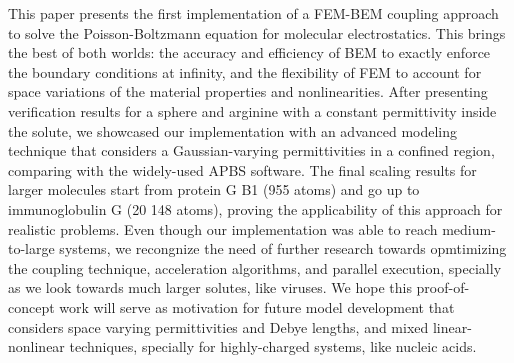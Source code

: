 This paper presents the first implementation of a FEM-BEM coupling approach to solve the Poisson-Boltzmann equation for molecular electrostatics. This brings the best of both worlds: the accuracy and efficiency of BEM to exactly enforce the boundary conditions at infinity, and the flexibility of FEM to account for space variations of the material properties and nonlinearities. After presenting verification results for a sphere and arginine with a constant permittivity inside the solute, we showcased our implementation with an advanced modeling technique that considers a Gaussian-varying permittivities in a confined region, comparing with the widely-used APBS software. The final scaling results for larger molecules start from protein G B1 (955 atoms) and go up to immunoglobulin G (20 148 atoms), proving the applicability of this approach for realistic problems. Even though our implementation was able to reach medium-to-large systems, we recongnize the need of further research towards opmtimizing the coupling technique, acceleration algorithms, and parallel execution, specially as we look towards much larger solutes, like viruses. We hope this proof-of-concept work will serve as motivation for future model development that considers space varying permittivities and Debye lengths, and mixed linear-nonlinear techniques, specially for highly-charged systems, like nucleic acids. 
